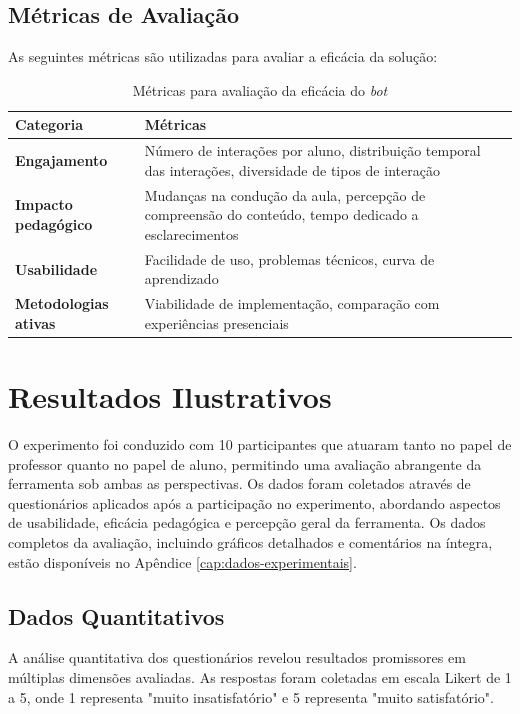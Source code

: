 \subsection{Métricas de Avaliação}
\label{subsec:metricas}

As seguintes métricas são utilizadas para avaliar a eficácia da solução:

\begin{table}[htb]
\centering
\caption{Métricas para avaliação da eficácia do \textit{bot}}
\label{tab:metricas}
\begin{tabular}{|p{3cm}|p{9cm}|}
\hline
\textbf{Categoria} & \textbf{Métricas} \\
\hline
\textbf{Engajamento} & Número de interações por aluno, distribuição temporal das
interações, diversidade de tipos de interação \\
\hline
\textbf{Impacto pedagógico} & Mudanças na condução da aula, percepção de
compreensão do conteúdo, tempo dedicado a esclarecimentos \\
\hline
\textbf{Usabilidade} & Facilidade de uso, problemas técnicos, curva de
aprendizado \\
\hline
\textbf{Metodologias ativas} & Viabilidade de implementação, comparação com
experiências presenciais \\
\hline
\end{tabular}
\end{table}

\section{Resultados Ilustrativos}
\label{sec:resultados}

O experimento foi conduzido com 10 participantes que atuaram tanto no papel de
professor quanto no papel de aluno, permitindo uma avaliação abrangente da
ferramenta sob ambas as perspectivas. Os dados foram coletados através de
questionários aplicados após a participação no experimento, abordando aspectos
de usabilidade, eficácia pedagógica e percepção geral da ferramenta. Os dados
completos da avaliação, incluindo gráficos detalhados e comentários na íntegra,
estão disponíveis no Apêndice \ref{cap:dados-experimentais}.

\subsection{Dados Quantitativos}
\label{subsec:dados-quant}

A análise quantitativa dos questionários revelou resultados promissores em
múltiplas dimensões avaliadas. As respostas foram coletadas em escala Likert de
1 a 5, onde 1 representa "muito insatisfatório" e 5 representa "muito
satisfatório".

